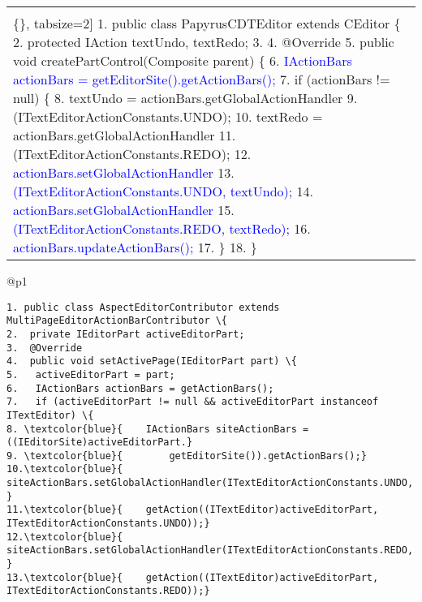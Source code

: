 \begin{figure*}[!htb]
\begin{minipage}{0.5\textwidth}
\begin{tabular}{@{}p{}}
  \vspace{-4mm}
\begin{Verbatim}[commandchars=\\\{\}, tabsize=2]
1. public class PapyrusCDTEditor extends CEditor \{
2.     protected IAction textUndo, textRedo;
3.    
4.   @Override
5.   public void createPartControl(Composite parent) \{
6. \textcolor{blue}{      IActionBars actionBars = getEditorSite().getActionBars();}
7.      if (actionBars != null) \{
8.          textUndo = actionBars.getGlobalActionHandler
9.            (ITextEditorActionConstants.UNDO);
10.        textRedo = actionBars.getGlobalActionHandler
11.	   (ITextEditorActionConstants.REDO);
12.\textcolor{blue}{	   actionBars.setGlobalActionHandler}
13.\textcolor{blue}{	     (ITextEditorActionConstants.UNDO, textUndo);}
14.\textcolor{blue}{   actionBars.setGlobalActionHandler}
15.\textcolor{blue}{     (ITextEditorActionConstants.REDO, textRedo);}
16.\textcolor{blue}{   actionBars.updateActionBars();}
17.     \} 
18.   \}
 \end{Verbatim}
      \vspace{-4mm}
  \\   
\end{tabular} 
\end{minipage}
 \begin{minipage}{0.5\textwidth}
\scriptsize 
\begin{tabular}{@{}p{}} 
 \hline 
   \\ \hline
  \vspace{-4mm}
\begin{Verbatim}[commandchars=\\\{\}, tabsize=2]
1. public class AspectEditorContributor extends MultiPageEditorActionBarContributor \{
2.  private IEditorPart activeEditorPart;
3.  @Override
4.  public void setActivePage(IEditorPart part) \{
5.   activeEditorPart = part;
6.   IActionBars actionBars = getActionBars();
7.   if (activeEditorPart != null && activeEditorPart instanceof ITextEditor) \{
8. \textcolor{blue}{    IActionBars siteActionBars = ((IEditorSite)activeEditorPart.}
9. \textcolor{blue}{        getEditorSite()).getActionBars();}
10.\textcolor{blue}{  siteActionBars.setGlobalActionHandler(ITextEditorActionConstants.UNDO, }
11.\textcolor{blue}{    getAction((ITextEditor)activeEditorPart, ITextEditorActionConstants.UNDO));}
12.\textcolor{blue}{  siteActionBars.setGlobalActionHandler(ITextEditorActionConstants.REDO, }
13.\textcolor{blue}{    getAction((ITextEditor)activeEditorPart, ITextEditorActionConstants.REDO));}

\end{Verbatim}
\end{tabular}
\end{minipage}
\end{figure*}
